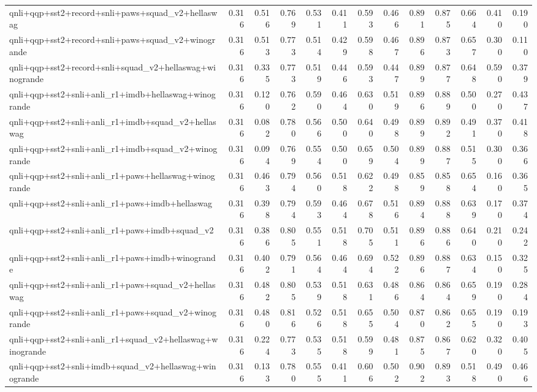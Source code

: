\begin{table}[t]
\begin{tabular}{lrrrrrrrrrrrr}
    qnli+qqp+sst2+record+snli+paws+squad\_v2+hellaswag & 0.316 & 0.516 & 0.769 & 0.531 & 0.411 & 0.593 & 0.466 & 0.891 & 0.875 & 0.664 & 0.410 & 0.190 \\
    qnli+qqp+sst2+record+snli+paws+squad\_v2+winogrande & 0.316 & 0.513 & 0.773 & 0.514 & 0.429 & 0.598 & 0.467 & 0.896 & 0.873 & 0.657 & 0.300 & 0.110 \\
    qnli+qqp+sst2+record+snli+squad\_v2+hellaswag+winogrande & 0.316 & 0.335 & 0.773 & 0.519 & 0.446 & 0.593 & 0.447 & 0.899 & 0.877 & 0.648 & 0.590 & 0.379 \\
    qnli+qqp+sst2+snli+anli\_r1+imdb+hellaswag+winogrande & 0.316 & 0.120 & 0.762 & 0.590 & 0.464 & 0.630 & 0.519 & 0.896 & 0.889 & 0.500 & 0.270 & 0.437 \\
    qnli+qqp+sst2+snli+anli\_r1+imdb+squad\_v2+hellaswag & 0.316 & 0.082 & 0.780 & 0.566 & 0.500 & 0.640 & 0.498 & 0.899 & 0.892 & 0.491 & 0.370 & 0.418 \\
    qnli+qqp+sst2+snli+anli\_r1+imdb+squad\_v2+winogrande & 0.316 & 0.094 & 0.769 & 0.554 & 0.500 & 0.659 & 0.504 & 0.899 & 0.887 & 0.515 & 0.300 & 0.366 \\
    qnli+qqp+sst2+snli+anli\_r1+paws+hellaswag+winogrande & 0.316 & 0.463 & 0.794 & 0.560 & 0.518 & 0.622 & 0.498 & 0.859 & 0.858 & 0.654 & 0.160 & 0.365 \\
    qnli+qqp+sst2+snli+anli\_r1+paws+imdb+hellaswag & 0.316 & 0.398 & 0.794 & 0.593 & 0.464 & 0.678 & 0.516 & 0.894 & 0.888 & 0.639 & 0.170 & 0.374 \\
    qnli+qqp+sst2+snli+anli\_r1+paws+imdb+squad\_v2 & 0.316 & 0.386 & 0.805 & 0.551 & 0.518 & 0.705 & 0.511 & 0.896 & 0.886 & 0.640 & 0.210 & 0.242 \\
    qnli+qqp+sst2+snli+anli\_r1+paws+imdb+winogrande & 0.316 & 0.402 & 0.791 & 0.564 & 0.464 & 0.694 & 0.522 & 0.896 & 0.887 & 0.634 & 0.150 & 0.325 \\
    qnli+qqp+sst2+snli+anli\_r1+paws+squad\_v2+hellaswag & 0.316 & 0.482 & 0.805 & 0.539 & 0.518 & 0.631 & 0.486 & 0.864 & 0.864 & 0.659 & 0.190 & 0.284 \\
    qnli+qqp+sst2+snli+anli\_r1+paws+squad\_v2+winogrande & 0.316 & 0.480 & 0.816 & 0.526 & 0.518 & 0.655 & 0.504 & 0.870 & 0.862 & 0.655 & 0.190 & 0.193 \\
    qnli+qqp+sst2+snli+anli\_r1+squad\_v2+hellaswag+winogrande & 0.316 & 0.224 & 0.773 & 0.535 & 0.518 & 0.599 & 0.481 & 0.875 & 0.867 & 0.620 & 0.320 & 0.405 \\
    qnli+qqp+sst2+snli+imdb+squad\_v2+hellaswag+winogrande & 0.316 & 0.133 & 0.780 & 0.555 & 0.411 & 0.606 & 0.502 & 0.902 & 0.893 & 0.518 & 0.490 & 0.466 \\

\end{tabular}
\end{table}
